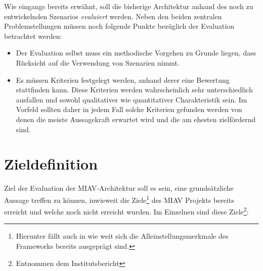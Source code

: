 \documentclass[12pt,headsepline,a4paper,bibtotoc,liststotoc,DIV12,BCOR12mm]{scrartcl}
\begin{document}
  Wie eingangs bereits erwähnt, soll die bisherige Architektur anhand des noch zu entwickelnden Szenarios \emph{evaluiert} werden. Neben den beiden zentralen Problemstellungen müssen noch folgende Punkte bezüglich der Evaluation betrachtet werden:

  \begin{itemize}
    \item Der Evaluation selbst muss ein methodische Vorgehen zu Grunde liegen, dass Rücksicht auf die Verwendung von Szenarien nimmt.
    \item Es müssen Kriterien festgelegt werden, anhand derer eine Bewertung stattfinden kann. Diese Kriterien werden wahrscheinlich sehr unterschiedlich ausfallen und sowohl qualitativer wie quantitativer Charakteristik sein. Im Vorfeld sollten daher in jedem Fall solche Kriterien gefunden werden von denen die meiste Aussagekraft erwartet wird und die am ehesten zielfördernd sind.
  \end{itemize}


\section{Zieldefinition} %
\label{sec:zieldefinition}

  Ziel der Evaluation der MIAV-Architektur soll es sein, eine grundsätzliche Aussage treffen zu können, inwieweit die Ziele\footnote{Hierunter fällt auch in wie weit sich die Alleinstellungsmerkmale des Frameworks bereits ausgeprägt sind.} des MIAV Projekts bereits erreicht und welche noch nicht erreicht wurden. Im Einzelnen sind diese Ziele\footnote{Entnommen dem Institutsbericht}:
  
\end{document}
